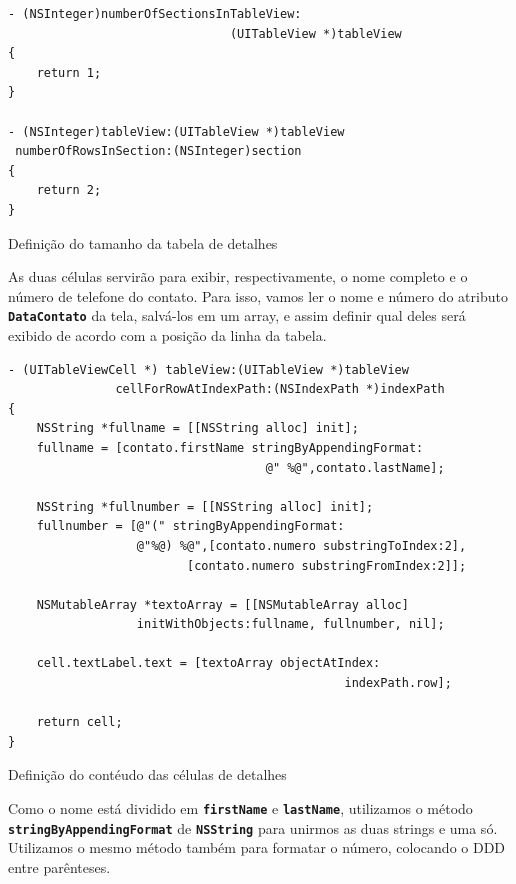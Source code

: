 \documentclass[a4paper,12pt,brazil,doubleside]{book}
\begin{document}
\begin{singlespace}
\begin{listing}[H]
\begin{verbatim}
- (NSInteger)numberOfSectionsInTableView:
                               (UITableView *)tableView
{        
    return 1;
}

- (NSInteger)tableView:(UITableView *)tableView
 numberOfRowsInSection:(NSInteger)section
{
    return 2;
}
\end{verbatim}
\caption{Definição do tamanho da tabela de detalhes}
\end{listing}


As duas células servirão para exibir, respectivamente, o nome completo e o número de telefone do contato. Para isso, vamos ler o nome e número do atributo \texttt{\textbf{DataContato}} da tela, salvá-los em um array, e assim definir qual deles será exibido de acordo com a posição da linha da tabela.

\begin{listing}[H]
\begin{verbatim}
- (UITableViewCell *) tableView:(UITableView *)tableView
               cellForRowAtIndexPath:(NSIndexPath *)indexPath
{
    NSString *fullname = [[NSString alloc] init];
    fullname = [contato.firstName stringByAppendingFormat:
                                    @" %@",contato.lastName];
    
    NSString *fullnumber = [[NSString alloc] init];
    fullnumber = [@"(" stringByAppendingFormat:
                  @"%@) %@",[contato.numero substringToIndex:2],
                         [contato.numero substringFromIndex:2]];
    
    NSMutableArray *textoArray = [[NSMutableArray alloc]
                  initWithObjects:fullname, fullnumber, nil];

    cell.textLabel.text = [textoArray objectAtIndex:
                                               indexPath.row];
    
    return cell;
}
\end{verbatim}
\caption{Definição do contéudo das células de detalhes}
\end{listing}


Como o nome está dividido em \texttt{\textbf{firstName}} e \texttt{\textbf{lastName}}, utilizamos o método\\
\texttt{\textbf{stringByAppendingFormat}} de \texttt{\textbf{NSString}} para unirmos as duas strings e uma só. Utilizamos o mesmo método também para formatar o número, colocando o DDD entre parênteses.


\end{singlespace}
\end{document}
